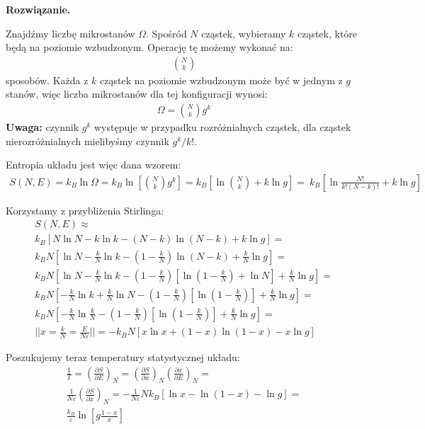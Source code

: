 \documentclass[11pt,a4paper]{article}
\newenvironment{solution}{\vspace{1cm} \par\textbf{Rozwiązanie.} \vspace{1cm}}{}
\begin{document}
\begin{solution}

Znajdźmy liczbę mikrostanów $\Omega$. Spośród $N$ cząstek, wybieramy $k$ cząstek, 
które będą na poziomie wzbudzonym. Operację tę możemy wykonać na:
\begin{align*}
\binom{N}{k}
\end{align*}
sposobów. Każda z $k$ cząstek na poziomie wzbudzonym może być w jednym z $g$ stanów, więc 
liczba mikrostanów dla tej konfiguracji wynosi:
\begin{align*}
\Omega = \binom{N}{k} g^k
\end{align*}
{\bf Uwaga:} czynnik $g^k$ występuje w przypadku rozróżnialnych cząstek, dla cząstek nierozróżnialnych 
mielibyśmy czynnik $g^k/k!$.

\vspace{1cm}

Entropia układu jest więc dana wzorem:
\begin{align*}
S(N,E) = k_B \ln \Omega = k_B \ln \left[\binom{N}{k} g^k \right] = k_B \left[\ln \binom{N}{k} + k \ln g \right] = \
k_B \left[ \ln \frac{N!}{k!(N-k)!} + k \ln g \right]
\end{align*}

Korzystamy z przybliżenia Stirlinga:
\begin{align*}
S(N,E) \approx \\
k_B \left[ N\ln N - k\ln k - (N-k)\ln(N-k) + k \ln g \right] = \\
k_B N \left[ \ln N - \frac{k}{N}\ln k - \left(1-\frac{k}{N}\right)\ln(N-k) + \frac{k}{N} \ln g \right] = \\
k_B N \left[ \ln N - \frac{k}{N}\ln k - \left(1-\frac{k}{N}\right)\left[\ln \left(1-\frac{k}{N}\right) + \ln N \right] + \frac{k}{N} \ln g \right] = \\
k_B N \left[ - \frac{k}{N}\ln k + \frac{k}{N}\ln N - \left(1-\frac{k}{N}\right)\left[\ln \left(1-\frac{k}{N}\right) \right] + \frac{k}{N} \ln g \right] = \\
k_B N \left[ - \frac{k}{N}\ln \frac{k}{N} - \left(1-\frac{k}{N}\right)\left[\ln \left(1-\frac{k}{N}\right) \right] + \frac{k}{N} \ln g \right] = \\
|| x = \frac{k}{N} = \frac{E}{N\varepsilon} || = -k_B N \left[x\ln x + (1-x)\ln(1-x) - x \ln g \right] 
\end{align*}

Poszukujemy teraz temperatury statystycznej układu:
\begin{align*}
\frac{1}{T} = \left( \frac{\partial S}{\partial E} \right)_N = \left( \frac{\partial S}{\partial x} \right)_N \left( \frac{\partial x}{\partial E} \right)_N = \\
\frac{1}{N\varepsilon} \left( \frac{\partial S}{\partial x} \right)_N = 
-\frac{1}{N\varepsilon} N k_B \left[\ln x - \ln (1-x) - \ln g \right] = \\  
\frac{k_B}{\varepsilon} \ln \left[ g \frac{1-x}{x} \right]
\end{align*}


\end{solution}
\end{document}
